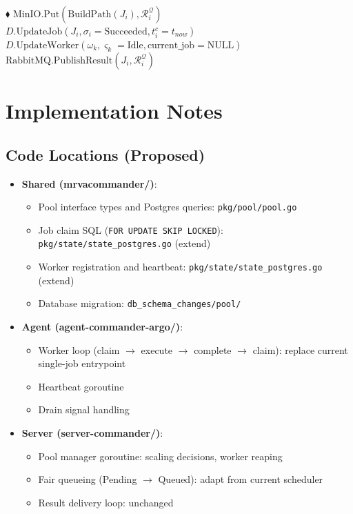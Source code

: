 \documentclass[11pt]{article}
\newcommand{\reporoot}{/Users/mhohn5/c/example/psa-mrva/mrvacommander}
\newcommand{\gomark}[2]{\href{vscode://file\reporoot/#1:#2}{\textcolor{gray!90}{$\blacklozenge$}}}
\begin{document}
\begin{algorithmic}[1]
        \State {}
        \gomark{pkg/state/state\_postgres.go}{1096}
        \State $\text{MinIO}.\text{Put}(\text{BuildPath}(J_i), \mathcal{R}_i^{\mathcal{Q}})$
        \State $D.\text{UpdateJob}(J_i, \sigma_i = \text{Succeeded}, t_i^c = t_{now})$
        \State $D.\text{UpdateWorker}(\omega_k, \varsigma_k = \text{Idle},
          \text{current\_job} = \text{NULL})$
        \State $\text{RabbitMQ}.\text{PublishResult}(J_i, \mathcal{R}_i^{\mathcal{Q}})$

        \State {}
      \EndWhile

    \EndProcedure
\end{algorithmic}


\section{Implementation Notes}

\subsection{Code Locations (Proposed)}

\begin{itemize}
\item \textbf{Shared (mrvacommander/)}:
  \begin{itemize}
  \item Pool interface types and Postgres queries:
    \texttt{pkg/pool/pool.go}
  \item Job claim SQL (\texttt{FOR UPDATE SKIP LOCKED}):
    \texttt{pkg/state/state\_postgres.go} (extend)
  \item Worker registration and heartbeat:
    \texttt{pkg/state/state\_postgres.go} (extend)
  \item Database migration:
    \texttt{db\_schema\_changes/pool/}
  \end{itemize}

\item \textbf{Agent (agent-commander-argo/)}:
  \begin{itemize}
  \item Worker loop (claim $\to$ execute $\to$ complete $\to$ claim):
    replace current single-job entrypoint
  \item Heartbeat goroutine
  \item Drain signal handling
  \end{itemize}

\item \textbf{Server (server-commander/)}:
  \begin{itemize}
  \item Pool manager goroutine: scaling decisions, worker reaping
  \item Fair queueing (Pending $\to$ Queued): adapt from current scheduler
  \item Result delivery loop: unchanged
  \end{itemize}
\end{itemize}
\end{document}
